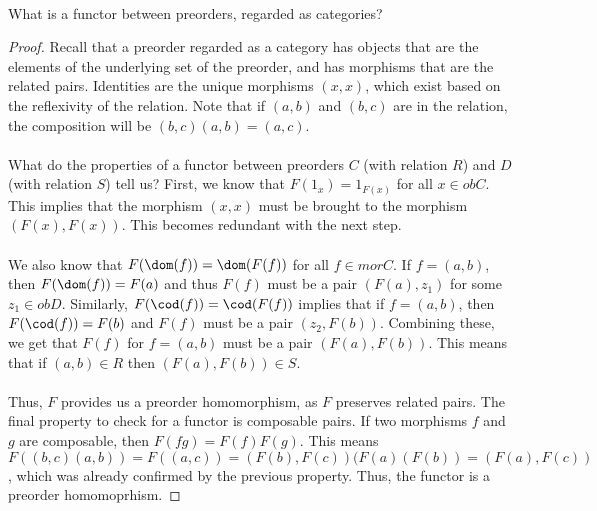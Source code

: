\documentclass[main.tex]{subfiles}
\begin{document}
\paragraph{}

\begin{exercise}
	What is a functor between preorders, regarded as categories?
\end{exercise}

\begin{proof}
	Recall that a preorder regarded as a category has objects that are the
	elements of the underlying set of the preorder, and has morphisms that are
	the related pairs.  Identities are the unique morphisms $(x,x)$, which exist
	based on the reflexivity of the relation.  Note that if $(a,b)$ and $(b,c)$
	are in the relation, the composition will be $(b,c)(a,b) = (a,c)$.\\ \\ What
	do the properties of a functor between preorders $C$ (with relation $R$) and
	$D$ (with relation $S$) tell us?  First, we know that $F(1_x) = 1_{F(x)}$
	for all $x \in obC$.  This implies that the morphism $(x,x)$ must be brought
	to the morphism $(F(x),F(x))$.  This becomes redundant with the next step.
	\\ \\ We also know that $F(\dom(f)) = \dom(F(f))$ for all $f \in morC$.  If
	$f = (a,b)$, then $F(\dom(f)) = F(a)$ and thus $F(f)$ must be a pair $(F(a),
	z_1)$ for some $z_1 \in obD$.  Similarly, $F(\cod(f)) = \cod(F(f))$ implies
	that if $f = (a,b)$, then $F(\cod(f)) = F(b)$ and $F(f)$ must be a pair
	$(z_2,F(b))$.  Combining these, we get that $F(f)$ for $f = (a,b)$ must be a
	pair $(F(a),F(b))$.  This means that if $(a,b) \in R$  then $(F(a),F(b)) \in
	S$.  \\ \\ Thus, $F$ provides us a preorder homomorphism, as $F$ preserves
	related pairs.  The final property to check for a functor is composable
	pairs.  If two morphisms $f$ and $g$ are composable, then $F(fg) =
	F(f)F(g)$.  This means $F((b,c)(a,b)) = F((a,c)) = (F(b),F(c))(F(a)(F(b)) =
	(F(a),F(c))$, which was already confirmed by the previous property.  Thus,
	the functor is a preorder homomoprhism.
\end{proof}
\end{document}
